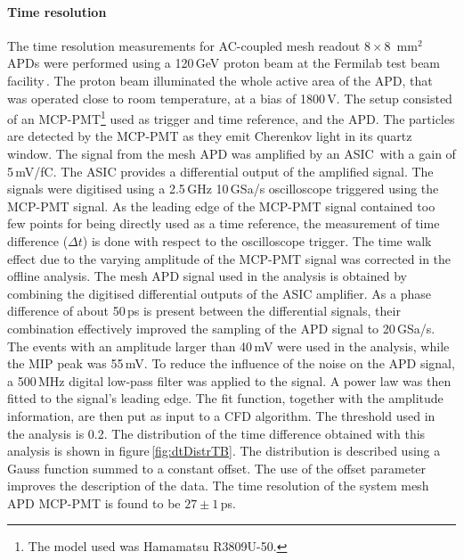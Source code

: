 \documentclass[review,number,sort&compress]{elsarticle}
\begin{document}
\paragraph{Time resolution}
The time resolution measurements for AC-coupled mesh readout $8 \times 8$~mm$^2$ APDs were performed using a 120\,GeV proton  beam at the Fermilab test beam facility\,\cite{ftbfPage}.
The proton beam illuminated the whole active area of the APD, that was operated close to room temperature, at a bias of 1800\,V.
The setup consisted of an MCP-PMT\footnote{The model used was Hamamatsu R3809U-50.} used as trigger and time reference, and the APD.
The particles are detected by the MCP-PMT as they emit Cherenkov light in its quartz window.
The signal from the mesh APD was amplified by an ASIC\,\cite{whiteACES2014} with a gain of 5\,mV/fC.
The ASIC provides a differential output of the amplified signal.
The signals were digitised using a 2.5\,GHz 10\,GSa/s oscilloscope triggered using the MCP-PMT signal.
As the leading edge of the MCP-PMT signal contained too few points for being directly used as a time reference, the measurement of time difference ($\Delta t$) is done with respect to the oscilloscope trigger.
The time walk effect due to the varying amplitude of the MCP-PMT signal was corrected in the offline analysis.
The mesh APD signal used in the analysis is obtained by combining the digitised differential outputs of the ASIC amplifier.
As a phase difference of about 50\,ps is present between the differential signals, their combination effectively improved the sampling of the APD signal to 20\,GSa/s.
The events with an amplitude larger than 40\,mV were used in the analysis, while the MIP peak was 55\,mV.
To reduce the influence of the noise on the APD signal, a 500\,MHz digital low-pass filter was applied to the signal.
A power law was then fitted to the signal's leading edge.
The fit function, together with the amplitude information, are then put as input to a CFD algorithm.
The threshold used in the analysis is 0.2.
The distribution of the time difference obtained with this analysis is shown in figure\,\ref{fig:dtDistrTB}.
The distribution is described using a Gauss function summed to a constant offset.
The use of the offset parameter improves the description of the data.
The time resolution of the system mesh APD MCP-PMT is found to be $27 \pm 1$\,ps.
\end{document}
